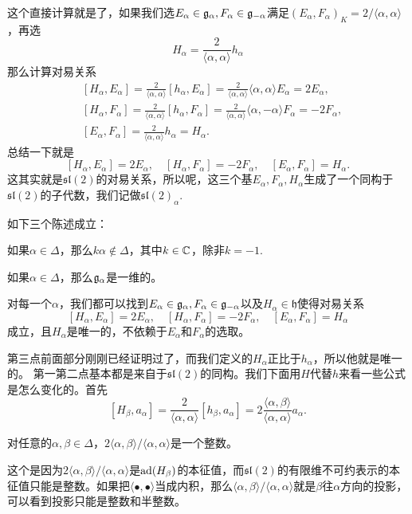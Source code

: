 这个直接计算就是了，如果我们选$E_\alpha\in{\mathfrak{g}}_\alpha,F_\alpha\in{\mathfrak{g}}_{-\alpha}$满足$(E_\alpha,F_{\alpha})_K=2/\langle \alpha,\alpha \rangle$，再选
\[
	H_\alpha=\frac{2}{\langle \alpha,\alpha \rangle}h_\alpha
\]
那么计算对易关系
\[
	\begin{split}
	&[H_\alpha,E_\alpha]=\frac{2}{\langle \alpha,\alpha \rangle}[h_\alpha,E_\alpha]=\frac{2}{\langle \alpha,\alpha \rangle}\langle \alpha,\alpha \rangle E_\alpha=2E_\alpha,\\
	&[H_\alpha,F_\alpha]=\frac{2}{\langle \alpha,\alpha \rangle}[h_\alpha,F_\alpha]=\frac{2}{\langle \alpha,\alpha \rangle}\langle \alpha,-\alpha \rangle F_\alpha=-2F_\alpha,\\
	&[E_\alpha,F_\alpha]=\frac{2}{\langle \alpha,\alpha \rangle}h_\alpha=H_\alpha.
	\end{split}
\]
总结一下就是
\[
	[H_\alpha,E_\alpha]=2E_\alpha,\quad[H_\alpha,F_\alpha]=-2F_\alpha,\quad[E_\alpha,F_\alpha]=H_\alpha.
\]
这其实就是$\mathfrak{sl}(2)$的对易关系，所以呢，这三个基$E_\alpha,F_\alpha,H_\alpha$生成了一个同构于$\mathfrak{sl}(2)$的子代数，我们记做$\mathfrak{sl}(2)_\alpha$.\

\theo 如下三个陈述成立：

如果$\alpha\in\Delta$，那么$k\alpha\notin \Delta$，其中$k\in \mathbb{C}$，除非$k=-1$.

如果$\alpha\in\Delta$，那么${\mathfrak{g}}_\alpha$是一维的。

对每一个$\alpha$，我们都可以找到$E_\alpha\in{\mathfrak{g}}_\alpha,F_\alpha\in{\mathfrak{g}}_{-\alpha}$以及$H_\alpha\in\mathfrak{h}$使得对易关系
\[
[H_\alpha,E_\alpha]=2E_\alpha,\quad[H_\alpha,F_\alpha]=-2F_\alpha,\quad[E_\alpha,F_\alpha]=H_\alpha
\]
成立，且$H_\alpha$是唯一的，不依赖于$E_\alpha$和$F_\alpha$的选取。

第三点前面部分刚刚已经证明过了，而我们定义的$H_\alpha$正比于$h_\alpha$，所以他就是唯一的。
第一第二点基本都是来自于$\mathfrak{sl}(2)$的同构。我们下面用$H$代替$h$来看一些公式是怎么变化的。首先
\[
	[H_\beta,a_\alpha]=\frac{2}{\langle \alpha,\alpha \rangle}[h_\beta,a_\alpha]=2\frac{\langle \alpha,\beta \rangle}{\langle \alpha,\alpha \rangle} a_\alpha.
\]

\pro 对任意的$\alpha,\beta\in \Delta$，$2\langle \alpha,\beta \rangle/\langle \alpha,\alpha \rangle$是一个整数。

这个是因为$2\langle \alpha,\beta \rangle/\langle \alpha,\alpha \rangle$是$\operatorname{ad}(H_\beta)$的本征值，而$\mathfrak{sl}(2)$的有限维不可约表示的本征值只能是整数。如果把$\langle \bullet,\bullet \rangle$当成内积，那么$\langle \alpha,\beta \rangle/\langle \alpha,\alpha \rangle$就是$\beta$往$\alpha$方向的投影，可以看到投影只能是整数和半整数。

